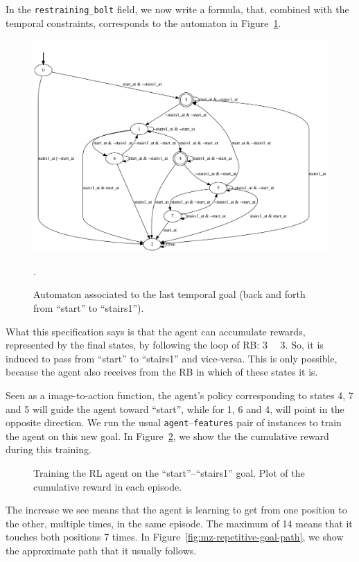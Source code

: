 In the \verb|restraining_bolt| field, we now write a \ldl{} formula, that,
combined with the temporal constraints, corresponds to the automaton in
Figure~\ref{fig:mz-repetitive-goal-automa}.
\begin{figure}
	\centering
	\includegraphics[width=\textwidth]{./imgs/mz-repetitive-goal-automa.pdf}
	\caption{Automaton associated to the last temporal goal (back and forth from
	``start'' to ``stairs1'').}.
	\label{fig:mz-repetitive-goal-automa}
\end{figure}
What this specification says is that the agent can accumulate rewards,
represented by the final states, by following the loop of RB: 3~   \to~3. So, it is induced to pass from ``start'' to ``stairs1'' and
vice-versa. This is only possible, because the agent also receives from the RB
in which of these states it is.

Seen as a image-to-action function, the agent's policy corresponding to
states 4, 7 and 5 will guide the agent toward ``start'', while for 1, 6 and 4,
will point in the opposite direction. We run the usual
\texttt{agent}--\texttt{features} pair of instances to train the agent on this
new goal. In Figure~\ref{fig:mz-repetitive-goal-reward}, we show the
the cumulative reward during this training.
\begin{figure}
	\centering
	\caption{Training the RL agent on the ``start''--``stairs1'' goal. Plot of
	the cumulative reward in each episode.}
	\label{fig:mz-repetitive-goal-reward}
\end{figure}
The increase we see means that the agent is learning to get from one position
to the other, multiple times, in the same episode. The maximum of 14 means
that it touches both positions 7 times. In
Figure~\ref{fig:mz-repetitive-goal-path}, we show the approximate path that it
usually follows.

